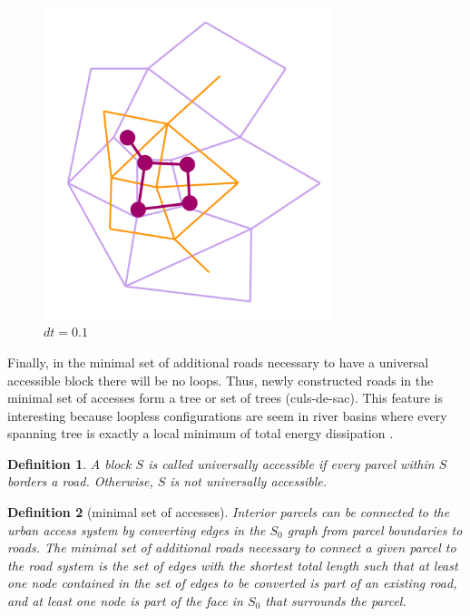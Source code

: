 \documentclass[10pt]{article}
\newtheorem{definition}{Definition}
\begin{document}
\begin{figure}[H]
\begin{minipage}{.33\textwidth}
    \end{minipage}%
    \begin{minipage}{.33\textwidth}
        \centering
        \includegraphics[width=0.75\textwidth]{images/dual3}
        \caption{$dt=0.1$}
        \label{fig:prob1_6_2}
    \end{minipage}
\end{figure}


Finally, in the minimal set of additional roads necessary to have a universal accessible block there will be no loops. Thus, newly constructed roads in the minimal set of accesses form a tree or set of trees (culs-de-sac). This feature is interesting because loopless configurations are seem in river basins where every spanning tree is exactly a local minimum of total energy dissipation \cite{and}.\\

\begin{definition}
A block $S$ is called universally accessible if every parcel within $S$ borders a road.  Otherwise, $S$ is not universally accessible.
\end{definition}

\begin{definition}[minimal set of accesses]
Interior parcels can be connected to the urban access system by converting edges in the $S_0$ graph from parcel boundaries to roads.  The minimal set of additional roads necessary to connect a given parcel to the road system is the set of edges with the shortest total length such that at least one node contained in the set of edges to be converted is part of an existing road, and at least one node is part of the face in $S_0$ that surrounds the parcel.
\end{definition}
\end{document}
